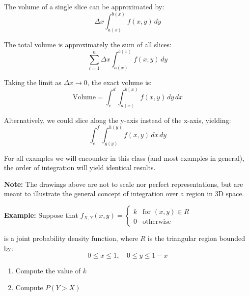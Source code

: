 \documentclass{article}
\begin{document}
\begin{center}
        \end{center}
        The volume of a single slice can be approximated by:
        \[ \Delta x \int_{a(x)}^{b(x)} f(x,y) \, dy \]
        
        The total volume is approximately the sum of all slices:
        \[ \sum_{i=1}^{n} \Delta x \int_{a(x)}^{b(x)} f(x,y) \, dy \]

        Taking the limit as $\Delta x \to 0$, the exact volume is:
        \[ \text{Volume} = \int_c^d \int_{a(x)}^{b(x)} f(x,y) \, dy \, dx \]

        Alternatively, we could slice along the y-axis instead of the x-axis, yielding:
        \[ \int_e^f \int_{g(y)}^{h(y)} f(x,y) \, dx \, dy \]

        For all examples we will encounter in this class (and most examples in general), the order of integration 
        will yield identical results.

        \vspace{0.3cm}
        \noindent
        \textbf{Note:} The drawings above are not to scale nor perfect representations, but are meant to illustrate 
        the general concept of integration over a region in 3D space.

        \pagebreak
        \textbf{Example:}
        Suppose that $f_{X,Y}(x,y) = 
        \begin{cases}
            k & \text{for } (x,y) \in R \\
            0 & \text{otherwise}
        \end{cases}$

        is a joint probability density function, where $R$ is the triangular region bounded by:
        \[ 0 \leq x \leq 1, \quad 0 \leq y \leq 1-x \]

        \begin{enumerate}
            \item Compute the value of $k$
            \item Compute $P(Y > X)$
        \end{enumerate}
\end{document}
